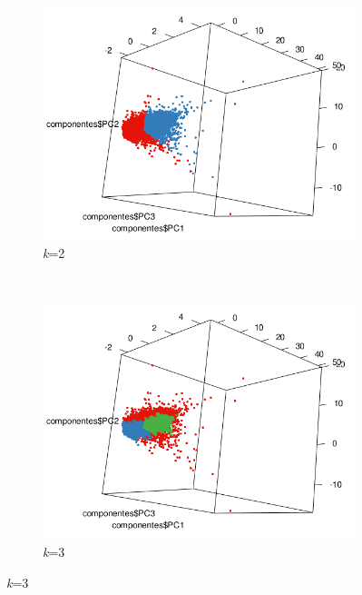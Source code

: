\documentclass[12pt]{article}
\numberwithin{equation}{section}
\numberwithin{table}{section}
\numberwithin{figure}{section}
\begin{document}
\begin{figure}
        \centering
        ~
        \begin{subfigure}[b]{0.33\textwidth}
                \includegraphics[width=1\textwidth]{imagenes/k2}
                \caption{\emph{k}=2}
        \end{subfigure}
        ~
        \begin{subfigure}[b]{0.33\textwidth}
                \includegraphics[width=1\textwidth]{imagenes/k3}
                \caption{\emph{k}=3}
        \end{subfigure}


\end{figure}
\end{document}
